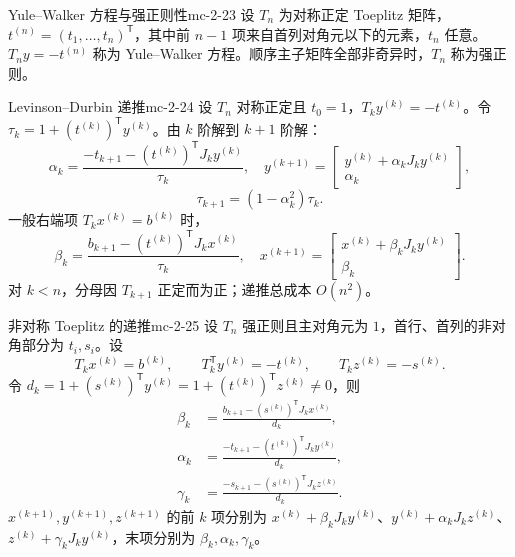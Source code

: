 \begin{definition}{Yule--Walker 方程与强正则性}{mc-2-23}
设 $T_n$ 为对称正定 Toeplitz 矩阵，$t^{(n)}=(t_1,\ldots,t_n)^{\mathsf T}$，其中前 $n-1$ 项来自首列对角元以下的元素，$t_n$ 任意。$T_ny=-t^{(n)}$ 称为 Yule--Walker 方程。顺序主子矩阵全部非奇异时，$T_n$ 称为强正则。
\end{definition}

\begin{proposition}{Levinson--Durbin 递推}{mc-2-24}
设 $T_n$ 对称正定且 $t_0=1$，$T_ky^{(k)}=-t^{(k)}$。令 $\tau_k=1+(t^{(k)})^{\mathsf T}y^{(k)}$。由 $k$ 阶解到 $k+1$ 阶解：
\[
\alpha_k=\frac{-t_{k+1}-(t^{(k)})^{\mathsf T}J_ky^{(k)}}{\tau_k},\quad
y^{(k+1)}=\begin{bmatrix}y^{(k)}+\alpha_kJ_ky^{(k)}\\\alpha_k\end{bmatrix},
\]
\[\tau_{k+1}=(1-\alpha_k^2)\tau_k.\]
一般右端项 $T_kx^{(k)}=b^{(k)}$ 时，
\[
\beta_k=\frac{b_{k+1}-(t^{(k)})^{\mathsf T}J_kx^{(k)}}{\tau_k},\quad
x^{(k+1)}=\begin{bmatrix}x^{(k)}+\beta_kJ_ky^{(k)}\\\beta_k\end{bmatrix}.
\]
对 $k<n$，分母因 $T_{k+1}$ 正定而为正；递推总成本 $O(n^2)$。
\end{proposition}

\begin{proposition}{非对称 Toeplitz 的递推}{mc-2-25}
设 $T_n$ 强正则且主对角元为 $1$，首行、首列的非对角部分为 $t_i,s_i$。设
\[T_kx^{(k)}=b^{(k)},\qquad T_k^{\mathsf T}y^{(k)}=-t^{(k)},\qquad T_kz^{(k)}=-s^{(k)}.\]
令 $d_k=1+(s^{(k)})^{\mathsf T}y^{(k)}=1+(t^{(k)})^{\mathsf T}z^{(k)}\ne0$，则
\[
\begin{aligned}
\beta_k&=\frac{b_{k+1}-(s^{(k)})^{\mathsf T}J_kx^{(k)}}{d_k},\\
\alpha_k&=\frac{-t_{k+1}-(t^{(k)})^{\mathsf T}J_ky^{(k)}}{d_k},\\
\gamma_k&=\frac{-s_{k+1}-(s^{(k)})^{\mathsf T}J_kz^{(k)}}{d_k}.
\end{aligned}
\]
$x^{(k+1)},y^{(k+1)},z^{(k+1)}$ 的前 $k$ 项分别为
$x^{(k)}+\beta_kJ_ky^{(k)}$、$y^{(k)}+\alpha_kJ_kz^{(k)}$、$z^{(k)}+\gamma_kJ_ky^{(k)}$，末项分别为 $\beta_k,\alpha_k,\gamma_k$。
\end{proposition}

